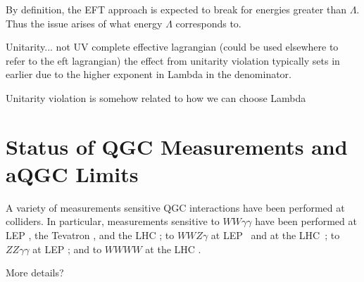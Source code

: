 By definition, the EFT approach is expected to break for energies
greater than $\Lambda$. Thus the issue arises of what energy 
$\Lambda$ corresponds to.

Unitarity...
not UV complete
effective lagrangian (could be used elsewhere to refer to the eft lagrangian)
the effect from unitarity violation typically sets in earlier due to the higher exponent in Lambda in the denominator. 

Unitarity violation is somehow related to how we can choose Lambda


\section{Status of QGC Measurements and aQGC Limits}
A variety of measurements sensitive QGC interactions have been
performed at colliders. In particular, measurements sensitive
to $WW\gamma\gamma$ have been performed 
at LEP \cite{Abdallah:2003xn,PhysRevD.70.032005}, 
the Tevatron \cite{PhysRevD.88.012005}, %
and the LHC \cite{PhysRevLett.115.031802,PhysRevD.90.032008,Chatrchyan:2013akv}; 
to $WWZ\gamma$ at LEP~\cite{Achard:2001eg,Abbiendi:1999aa,Abbiendi:2003jh}
and at the LHC~\cite{PhysRevD.90.032008};
to $ZZ\gamma\gamma$ at LEP \cite{Achard:2002iz,PhysRevD.70.032005}; 
and to $WWWW$ at the LHC \cite{PhysRevLett.113.141803,PhysRevLett.114.051801}. 



More details?


